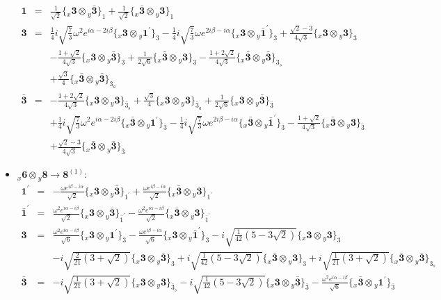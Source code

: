 \documentclass[english]{article}
\newcommand{\rep}[1]{\mathbf{#1}}
\newcommand{\repx}[2]{{}_{#2}\mathbf{#1}}
\newcommand{\subcg}[3]{\big\{ \repx{#1}{x}\otimes\repx{#2}{y}\big\}^{}_{#3}}
\begin{document}
\begin{itemize}
\begin{eqnarray*}
\rep{1} &=& \frac{1}{\sqrt{2}}\subcg{3}{\bar{3}}{1}+\frac{1}{\sqrt{2}}\subcg{\bar{3}}{3}{1}
\\
\rep{3} &=& \frac{1}{4} i \sqrt{\frac{7}{3}} \omega ^2 e^{i \alpha -2 i \beta }\subcg{3}{1^{\prime}}{3}-\frac{1}{4} i \sqrt{\frac{7}{3}} \omega  e^{2 i \beta -i \alpha }\subcg{3}{\bar{1}^{\prime}}{3}+\frac{\sqrt{2}-3}{4 \sqrt{3}}\subcg{3}{3}{3} \\ 
 & & -\frac{1+\sqrt{2}}{4 \sqrt{3}}\subcg{3}{\bar{3}}{3}+\frac{1}{2 \sqrt{6}}\subcg{\bar{3}}{3}{3}-\frac{1+2 \sqrt{2}}{4 \sqrt{3}}\subcg{\bar{3}}{\bar{3}}{3_{s}} \\ 
 & & +\frac{\sqrt{3}}{4}\subcg{\bar{3}}{\bar{3}}{3_{a}}
\\
\rep{\bar{3}} &=& -\frac{1+2 \sqrt{2}}{4 \sqrt{3}}\subcg{3}{3}{\bar{3}_{s}}+\frac{\sqrt{3}}{4}\subcg{3}{3}{\bar{3}_{a}}+\frac{1}{2 \sqrt{6}}\subcg{3}{\bar{3}}{\bar{3}} \\ 
 & & +\frac{1}{4} i \sqrt{\frac{7}{3}} \omega ^2 e^{i \alpha -2 i \beta }\subcg{\bar{3}}{1^{\prime}}{\bar{3}}-\frac{1}{4} i \sqrt{\frac{7}{3}} \omega  e^{2 i \beta -i \alpha }\subcg{\bar{3}}{\bar{1}^{\prime}}{\bar{3}}-\frac{1+\sqrt{2}}{4 \sqrt{3}}\subcg{\bar{3}}{3}{\bar{3}} \\ 
 & & +\frac{\sqrt{2}-3}{4 \sqrt{3}}\subcg{\bar{3}}{\bar{3}}{\bar{3}}
\end{eqnarray*}
\item $\repx{6}{x}\otimes\repx{8}{y}\to\rep{8}^{(1)}$:
\begin{eqnarray*}
\rep{1^{\prime}} &=& -\frac{\omega  e^{i \beta -i \alpha }}{\sqrt{2}}\subcg{3}{\bar{3}}{1^{\prime}}+\frac{\omega  e^{i \beta -i \alpha }}{\sqrt{2}}\subcg{\bar{3}}{3}{1^{\prime}}
\\
\rep{\bar{1}^{\prime}} &=& \frac{\omega ^2 e^{i \alpha -i \beta }}{\sqrt{2}}\subcg{3}{\bar{3}}{\bar{1}^{\prime}}-\frac{\omega ^2 e^{i \alpha -i \beta }}{\sqrt{2}}\subcg{\bar{3}}{3}{\bar{1}^{\prime}}
\\
\rep{3} &=& \frac{\omega ^2 e^{i \alpha -i \beta }}{\sqrt{6}}\subcg{3}{1^{\prime}}{3}-\frac{\omega  e^{i \beta -i \alpha }}{\sqrt{6}}\subcg{3}{\bar{1}^{\prime}}{3}-i \sqrt{\frac{1}{42} \left(5-3 \sqrt{2}\right)}\subcg{3}{3}{3} \\ 
 & & -i \sqrt{\frac{2}{21} \left(3+\sqrt{2}\right)}\subcg{3}{\bar{3}}{3}+i \sqrt{\frac{1}{42} \left(5-3 \sqrt{2}\right)}\subcg{\bar{3}}{3}{3}+i \sqrt{\frac{1}{21} \left(3+\sqrt{2}\right)}\subcg{\bar{3}}{\bar{3}}{3_{s}}
\\
\rep{\bar{3}} &=& -i \sqrt{\frac{1}{21} \left(3+\sqrt{2}\right)}\subcg{3}{3}{\bar{3}_{s}}-i \sqrt{\frac{1}{42} \left(5-3 \sqrt{2}\right)}\subcg{3}{\bar{3}}{\bar{3}}-\frac{\omega ^2 e^{i \alpha -i \beta }}{\sqrt{6}}\subcg{\bar{3}}{1^{\prime}}{\bar{3}} \\ 

\end{eqnarray*}
\end{itemize}
\end{document}
